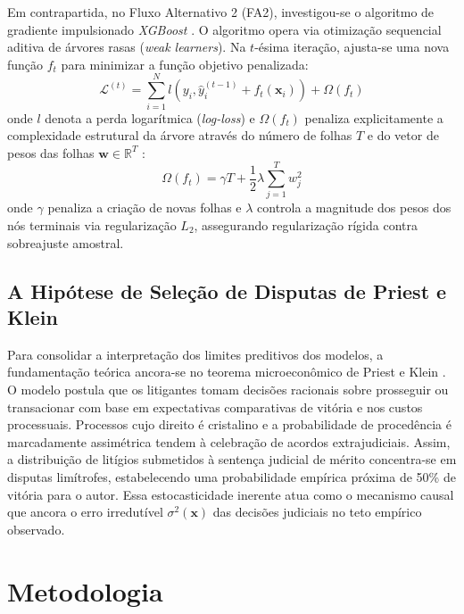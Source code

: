 \documentclass[conference]{IEEEtran}
\begin{document}
Em contrapartida, no Fluxo Alternativo 2 (FA2), investigou-se o algoritmo de gradiente impulsionado \textit{XGBoost} \cite{chen2016}. O algoritmo opera via otimização sequencial aditiva de árvores rasas (\textit{weak learners}). Na $t$-ésima iteração, ajusta-se uma nova função $f_t$ para minimizar a função objetivo penalizada:
\begin{equation}
\mathcal{L}^{(t)} = \sum_{i=1}^N l\left(y_i, \hat{y}_i^{(t-1)} + f_t(\mathbf{x}_i)\right) + \Omega(f_t)
\label{eq:xgboost_obj}
\end{equation}
onde $l$ denota a perda logarítmica (\textit{log-loss}) e $\Omega(f_t)$ penaliza explicitamente a complexidade estrutural da árvore através do número de folhas $T$ e do vetor de pesos das folhas $\mathbf{w} \in \mathbb{R}^T$ \cite{chen2016}:
\begin{equation}
\Omega(f_t) = \gamma T + \frac{1}{2}\lambda \sum_{j=1}^T w_j^2
\label{eq:xgboost_omega}
\end{equation}
onde $\gamma$ penaliza a criação de novas folhas e $\lambda$ controla a magnitude dos pesos dos nós terminais via regularização $L_2$, assegurando regularização rígida contra sobreajuste amostral.

\subsection{A Hipótese de Seleção de Disputas de Priest e Klein}
Para consolidar a interpretação dos limites preditivos dos modelos, a fundamentação teórica ancora-se no teorema microeconômico de Priest e Klein \cite{priest1984, trecenti2021}. O modelo postula que os litigantes tomam decisões racionais sobre prosseguir ou transacionar com base em expectativas comparativas de vitória e nos custos processuais. Processos cujo direito é cristalino e a probabilidade de procedência é marcadamente assimétrica tendem à celebração de acordos extrajudiciais. Assim, a distribuição de litígios submetidos à sentença judicial de mérito concentra-se em disputas limítrofes, estabelecendo uma probabilidade empírica próxima de 50\% de vitória para o autor. Essa estocasticidade inerente atua como o mecanismo causal que ancora o erro irredutível $\sigma^2(\mathbf{x})$ das decisões judiciais no teto empírico observado.

\newpage
\section{Metodologia}
\end{document}
